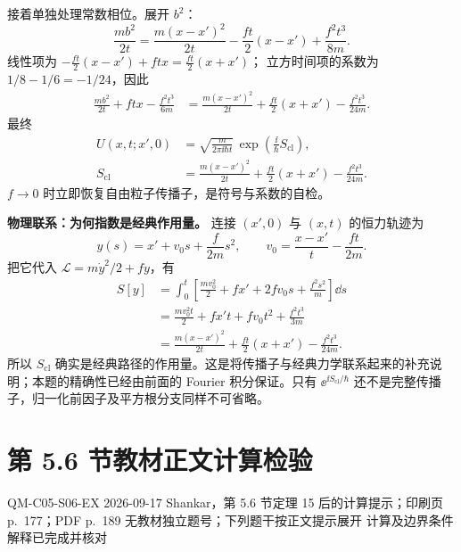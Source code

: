 \begin{checkedsolution}
接着单独处理常数相位。展开 $b^2$：
\begin{equation}
  \frac{mb^2}{2t}
  =\frac{m(x-x')^2}{2t}-\frac{ft}{2}(x-x')
    +\frac{f^2t^3}{8m}.
\end{equation}
线性项为 $-\tfrac{ft}{2}(x-x')+ftx=\tfrac{ft}{2}(x+x')$；
立方时间项的系数为 $1/8-1/6=-1/24$，因此
\begin{align}
  \frac{mb^2}{2t}+ftx-\frac{f^2t^3}{6m}
  &=\frac{m(x-x')^2}{2t}
   +\frac{ft}{2}(x+x')
   -\frac{f^2t^3}{24m}.
  \label{eq:QM-C05-S04-E03-classical-action}
\end{align}
最终
\begin{equation}
  \boxed{\begin{aligned}
  U(x,t;x',0)&=\sqrt{\frac{m}{2\pi\ii\hbar t}}\,
       \exp\left(\frac{\ii}{\hbar}S_{\mathrm{cl}}\right),\\
  S_{\mathrm{cl}}&=\frac{m(x-x')^2}{2t}
       +\frac{ft}{2}(x+x')-\frac{f^2t^3}{24m}.
  \end{aligned}}
  \label{eq:QM-C05-S04-E03-position-propagator}
\end{equation}
$f\to0$ 时立即恢复自由粒子传播子，是符号与系数的自检。

\textbf{物理联系：为何指数是经典作用量。}
连接 $(x',0)$ 与 $(x,t)$ 的恒力轨迹为
\begin{equation}
  y(s)=x'+v_0s+\frac{f}{2m}s^2,\qquad
  v_0=\frac{x-x'}{t}-\frac{ft}{2m}.
\end{equation}
把它代入 $\mathcal L=m\dot y^2/2+fy$，有
\begin{align}
  S[y]&=\int_0^t
      \left[\frac{mv_0^2}{2}+fx'+2fv_0s
             +\frac{f^2s^2}{m}\right]\dd s\\
      &=\frac{mv_0^2t}{2}+fx't+fv_0t^2
             +\frac{f^2t^3}{3m}\\
      &=\frac{m(x-x')^2}{2t}
        +\frac{ft}{2}(x+x')-\frac{f^2t^3}{24m}.
\end{align}
所以 $S_{\mathrm{cl}}$ 确实是经典路径的作用量。这是将传播子与经典力学联系起来的补充说明；本题的精确性已经由前面的 Fourier 积分保证。只有 $\ee^{\ii S_{\mathrm{cl}}/\hbar}$ 还不是完整传播子，归一化前因子及平方根分支同样不可省略。
\end{checkedsolution}

\section{第 5.6 节教材正文计算检验}
\label{exercise-set:QM-C05-S06}

\exercisemeta
  {QM-C05-S06-EX}
  {2026-09-17}
  {Shankar，第 5.6 节定理 15 后的计算提示；印刷页 p.~177；PDF p.~189}
  {无教材独立题号；下列题干按正文提示展开}
  {计算及边界条件解释已完成并核对}

